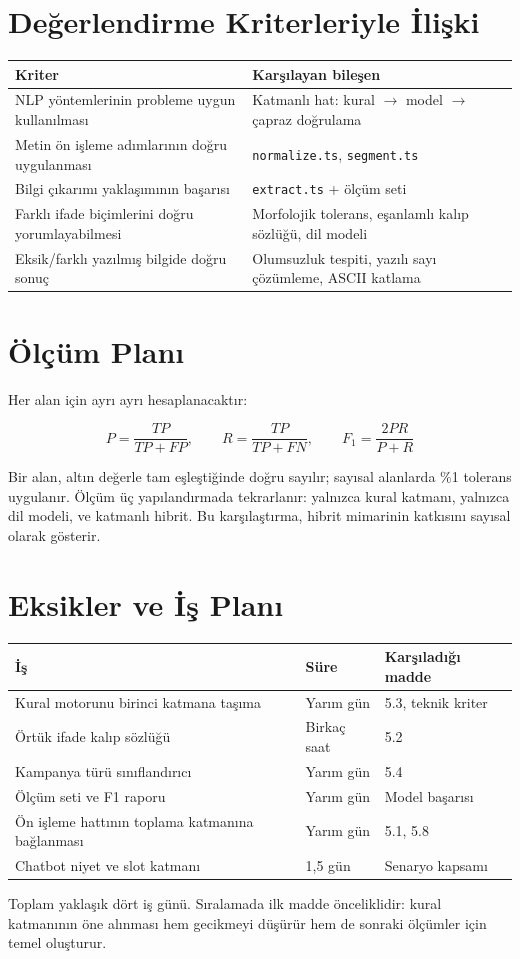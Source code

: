 \documentclass[11pt,a4paper]{article}
\newcommand{\dosya}[1]{\textcolor{kod}{\texttt{#1}}}
\begin{document}
\section{Değerlendirme Kriterleriyle İlişki}

\begin{center}
\begin{tabular}{p{6.6cm} p{7.2cm}}
\toprule
\textbf{Kriter} & \textbf{Karşılayan bileşen} \\
\midrule
NLP yöntemlerinin probleme uygun kullanılması & Katmanlı hat: kural $\rightarrow$ model $\rightarrow$ çapraz doğrulama \\
Metin ön işleme adımlarının doğru uygulanması & \dosya{normalize.ts}, \dosya{segment.ts} \\
Bilgi çıkarımı yaklaşımının başarısı & \dosya{extract.ts} + ölçüm seti \\
Farklı ifade biçimlerini doğru yorumlayabilmesi & Morfolojik tolerans, eşanlamlı kalıp sözlüğü, dil modeli \\
Eksik/farklı yazılmış bilgide doğru sonuç & Olumsuzluk tespiti, yazılı sayı çözümleme, ASCII katlama \\
\bottomrule
\end{tabular}
\end{center}

\section{Ölçüm Planı}

Her alan için ayrı ayrı hesaplanacaktır:

\[
P = \frac{TP}{TP+FP}, \qquad
R = \frac{TP}{TP+FN}, \qquad
F_1 = \frac{2PR}{P+R}
\]

Bir alan, altın değerle tam eşleştiğinde doğru sayılır; sayısal alanlarda
\%1 tolerans uygulanır. Ölçüm üç yapılandırmada tekrarlanır: yalnızca kural
katmanı, yalnızca dil modeli, ve katmanlı hibrit. Bu karşılaştırma, hibrit
mimarinin katkısını sayısal olarak gösterir.

\section{Eksikler ve İş Planı}

\begin{center}
\begin{tabular}{p{7.2cm} p{2.6cm} p{3.4cm}}
\toprule
\textbf{İş} & \textbf{Süre} & \textbf{Karşıladığı madde} \\
\midrule
Kural motorunu birinci katmana taşıma & Yarım gün & 5.3, teknik kriter \\
Örtük ifade kalıp sözlüğü & Birkaç saat & 5.2 \\
Kampanya türü sınıflandırıcı & Yarım gün & 5.4 \\
Ölçüm seti ve F1 raporu & Yarım gün & Model başarısı \\
Ön işleme hattının toplama katmanına bağlanması & Yarım gün & 5.1, 5.8 \\
Chatbot niyet ve slot katmanı & 1,5 gün & Senaryo kapsamı \\
\bottomrule
\end{tabular}
\end{center}

\vspace{0.4cm}
\noindent
Toplam yaklaşık dört iş günü. Sıralamada ilk madde önceliklidir: kural
katmanının öne alınması hem gecikmeyi düşürür hem de sonraki ölçümler için
temel oluşturur.
\end{document}
